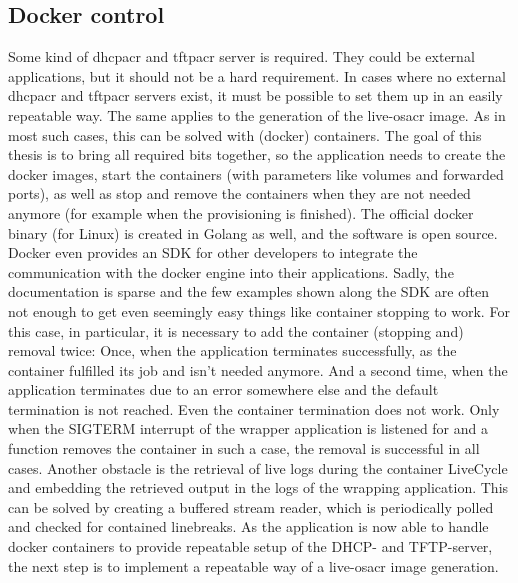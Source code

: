 \subsection{Docker control}
Some kind of \gls{dhcpacr} and \gls{tftpacr} server is required. They could be external applications, but it should not be a hard requirement. In cases where no external \gls{dhcpacr} and \gls{tftpacr} servers exist, it must be possible to set them up in an easily repeatable way. The same applies to the generation of the live-\gls{osacr} image. As in most such cases, this can be solved with (docker) containers. The goal of this thesis is to bring all required bits together, so the application needs to create the docker images, start the containers (with parameters like volumes and forwarded ports), as well as stop and remove the containers when they are not needed anymore (for example when the provisioning is finished).
\newline
The official docker binary (for Linux) is created in Golang as well, and the software is open source. Docker even provides an SDK for other developers to integrate the communication with the docker engine into their applications.
Sadly, the documentation is sparse and the few examples shown along the SDK are often not enough to get even seemingly easy things like container stopping to work. For this case, in particular, it is necessary to add the container (stopping and) removal twice: Once, when the application terminates successfully, as the container fulfilled its job and isn't needed anymore. And a second time, when the application terminates due to an error somewhere else and the default termination is not reached. Even  the container termination does not work. Only when the SIGTERM interrupt of the wrapper application is  listened for and a function removes the container in such a case, the removal is successful in all cases.
\newline
Another obstacle is the retrieval of live logs during the container LiveCycle and embedding the retrieved output in the logs of the wrapping application. This can be solved by creating a buffered stream reader, which is periodically polled and checked for contained linebreaks.
\newline
As the application is now able to handle docker containers to provide repeatable setup of the DHCP- and TFTP-server, the next step is to implement a repeatable way of a live-\gls{osacr} image generation.

